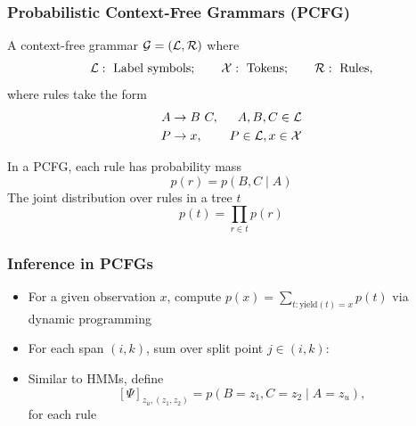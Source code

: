 \documentclass{beamer}
\begin{document}
\begin{frame}
\frametitle{Probabilistic Context-Free Grammars (PCFG)}
A context-free grammar $\mathcal{G} = (\mathcal{L},\mathcal{R})$ where
$$
    \mathcal{L}: \text{ Label symbols};\qquad
    \mathcal{X}: \text{ Tokens};\qquad
    \mathcal{R}: \text{ Rules},
$$
where rules take the form
\begin{align*}
A&\to B\ C, & A,B,C\in\mathcal{L} \\
P&\to x, & P \in\mathcal{L},x\in\mathcal{X}
\end{align*}

In a PCFG, each rule has probability mass
$$p(r) = p(B,C \mid A)$$
The joint distribution over rules in a tree $t$
$$p(t) = \prod_{r\in t} p(r)$$

\end{frame}

\begin{frame}
\frametitle{Inference in PCFGs}

\begin{itemize}
\item For a given observation $x$, compute $p(x) = \sum_{t: \text{yield}(t) = x} p(t)$
via dynamic programming
\vspace{1em}
\item For each span $(i,k)$, sum over split point $j \in (i,k)$:

\begin{center}
\end{center}

\item Similar to HMMs, define
$$[\Psi]_{z_u, (z_1,z_2)} = p(B=z_1,C=z_2 \mid A=z_u),$$
for each rule

\end{itemize}

\end{frame}
\end{document}
